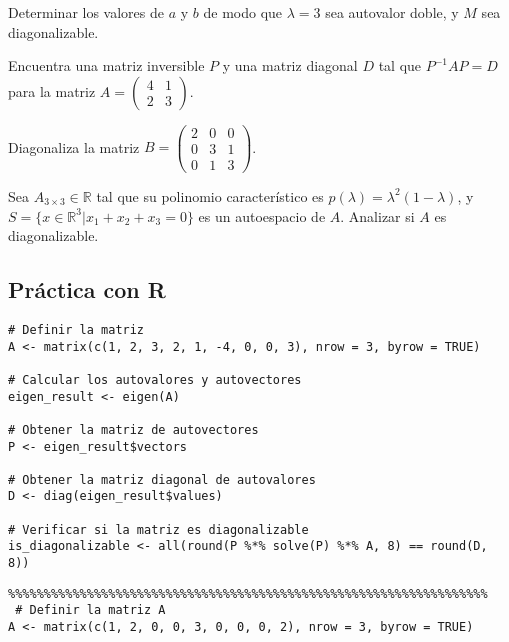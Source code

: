 \begin{}
\begin{exercise}
Determinar los valores de \( a \) y \( b \) de modo que \( \lambda = 3 \) sea autovalor doble, y \( M \) sea diagonalizable.
\end{exercise}
\begin{exercise}
Encuentra una matriz inversible \( P \) y una matriz diagonal \( D \) tal que \( P^{-1}AP = D \) para la matriz \( A = \begin{pmatrix} 4 & 1 \\ 2 & 3 \end{pmatrix} \).
\end{exercise}
\begin{exercise}
Diagonaliza la matriz \( B = \begin{pmatrix} 2 & 0 & 0 \\ 0 & 3 & 1 \\ 0 & 1 & 3 \end{pmatrix} \).   
\end{exercise}
\begin{exercise}
 Sea \( A_{3 \times 3}  \in \mathbb{R}\) tal que su polinomio característico es \( p(\lambda) = \lambda^2 (1 - \lambda) \), y \( S = \{ {x} \in \mathbb{R}^3 | x_1 + x_2 + x_3 = 0 \} \) es un autoespacio de \( A \). Analizar si \( A \) es diagonalizable.
   
\end{exercise}

\subsection{Práctica con R}
\begin{verbatim}
# Definir la matriz
A <- matrix(c(1, 2, 3, 2, 1, -4, 0, 0, 3), nrow = 3, byrow = TRUE)

# Calcular los autovalores y autovectores
eigen_result <- eigen(A)

# Obtener la matriz de autovectores
P <- eigen_result$vectors

# Obtener la matriz diagonal de autovalores
D <- diag(eigen_result$values)

# Verificar si la matriz es diagonalizable
is_diagonalizable <- all(round(P %*% solve(P) %*% A, 8) == round(D, 8))    
\end{verbatim}
\begin{verbatim}
%%%%%%%%%%%%%%%%%%%%%%%%%%%%%%%%%%%%%%%%%%%%%%%%%%%%%%%%%%%%%%%%%%%
 # Definir la matriz A
A <- matrix(c(1, 2, 0, 0, 3, 0, 0, 0, 2), nrow = 3, byrow = TRUE)


\end{verbatim}
\end{}
